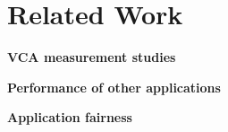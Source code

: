 \section{Related Work}\label{sec:related}
\textbf{VCA measurement studies}


\textbf{Performance of other applications}


\textbf{Application fairness}
